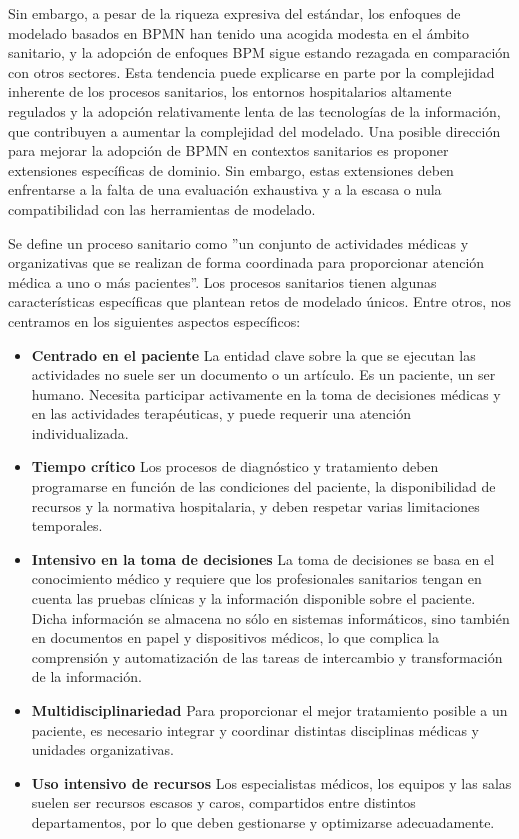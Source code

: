 Sin embargo, a pesar de la riqueza expresiva del estándar, los enfoques de modelado basados en BPMN han tenido una acogida modesta en el ámbito sanitario, y la adopción de enfoques BPM sigue estando rezagada en comparación con otros sectores. Esta tendencia puede explicarse en parte por la complejidad inherente de los procesos sanitarios, los entornos hospitalarios altamente regulados y la adopción relativamente lenta de las tecnologías de la información, que contribuyen a aumentar la complejidad del modelado. Una posible dirección para mejorar la adopción de BPMN en contextos sanitarios es proponer extensiones específicas de dominio. Sin embargo, estas extensiones deben enfrentarse a la falta de una evaluación exhaustiva y a la escasa o nula compatibilidad con las herramientas de modelado.

Se define un proceso sanitario como ''un conjunto de actividades médicas y organizativas que se realizan de forma coordinada para proporcionar atención médica a uno o más pacientes''. Los procesos sanitarios tienen algunas características específicas que plantean retos de modelado únicos. Entre otros, nos centramos en los siguientes aspectos específicos:

\begin{itemize}
    \item \textbf{Centrado en el paciente} La entidad clave sobre la que se ejecutan las actividades no suele ser un documento o un artículo. Es un paciente, un ser humano. Necesita participar activamente en la toma de decisiones médicas y en las actividades terapéuticas, y puede requerir una atención individualizada.
    \item \textbf{Tiempo crítico} Los procesos de diagnóstico y tratamiento deben programarse en función de las condiciones del paciente, la disponibilidad de recursos y la normativa hospitalaria, y deben respetar varias limitaciones temporales.
    \item \textbf{Intensivo en la toma de decisiones} La toma de decisiones se basa en el conocimiento médico y requiere que los profesionales sanitarios tengan en cuenta las pruebas clínicas y la información disponible sobre el paciente. Dicha información se almacena no sólo en sistemas informáticos, sino también en documentos en papel y dispositivos médicos, lo que complica la comprensión y automatización de las tareas de intercambio y transformación de la información.
    \item \textbf{Multidisciplinariedad} Para proporcionar el mejor tratamiento posible a un paciente, es necesario integrar y coordinar distintas disciplinas médicas y unidades organizativas.
    \item \textbf{Uso intensivo de recursos} Los especialistas médicos, los equipos y las salas suelen ser recursos escasos y caros, compartidos entre distintos departamentos, por lo que deben gestionarse y optimizarse adecuadamente.
\end{itemize}

